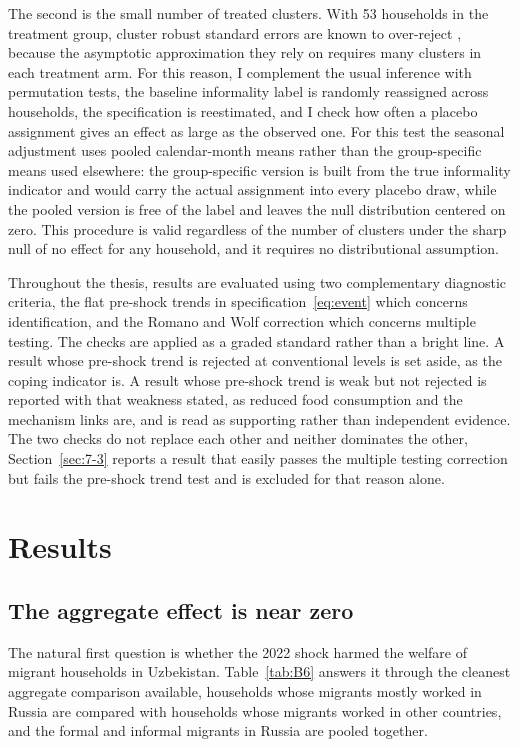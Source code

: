 The second is the small number of treated clusters. With 53 households in the treatment group, cluster robust standard errors are known to over-reject \parencite{bertrand2004,cameron2015}, because the asymptotic approximation they rely on requires many clusters in each treatment arm. For this reason, I complement the usual inference with permutation tests, the baseline informality label is randomly reassigned across households, the specification is reestimated, and I check how often a placebo assignment gives an effect as large as the observed one. For this test the seasonal adjustment uses pooled calendar-month means rather than the group-specific means used elsewhere: the group-specific version is built from the true informality indicator and would carry the actual assignment into every placebo draw, while the pooled version is free of the label and leaves the null distribution centered on zero. This procedure is valid regardless of the number of clusters under the sharp null of no effect for any household, and it requires no distributional assumption.

Throughout the thesis, results are evaluated using two complementary diagnostic criteria, the flat pre-shock trends in specification~\eqref{eq:event} which concerns identification, and the Romano and Wolf correction which concerns multiple testing. The checks are applied as a graded standard rather than a bright line. A result whose pre-shock trend is rejected at conventional levels is set aside, as the coping indicator is. A result whose pre-shock trend is weak but not rejected is reported with that weakness stated, as reduced food consumption and the mechanism links are, and is read as supporting rather than independent evidence. The two checks do not replace each other and neither dominates the other, Section~\ref{sec:7-3} reports a result that easily passes the multiple testing correction but fails the pre-shock trend test and is excluded for that reason alone.

\section{Results}\label{sec:7}

\subsection{The aggregate effect is near zero}\label{sec:7-1}

The natural first question is whether the 2022 shock harmed the welfare of migrant households in Uzbekistan. Table~\ref{tab:B6} answers it through the cleanest aggregate comparison available, households whose migrants mostly worked in Russia are compared with households whose migrants worked in other countries, and the formal and informal migrants in Russia are pooled together.


